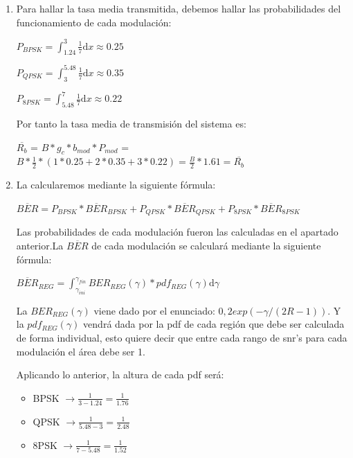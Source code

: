 \documentclass[fleqn,14pt]{article}
\begin{document}
\begin{enumerate}[1.]
    \item Para hallar la tasa media transmitida, debemos hallar las probabilidades del funcionamiento de cada modulación:

    \begin{center}
      $P_{BPSK} = \int_{1.24}^{3}\frac{1}{7} \mathrm{d}x \approx 0.25$

      $P_{QPSK} = \int_{3}^{5.48}\frac{1}{7} \mathrm{d}x \approx 0.35$

      $P_{8PSK} = \int_{5.48}^{7}\frac{1}{7} \mathrm{d}x \approx 0.22$
    \end{center}

    Por tanto la tasa media de transmisión del sistema es:
    \begin{center}
      $\overline{R_b}$ = $B * g_c * b_{mod} * P_{mod}$ = $B*\frac{1}{2}*(1*0.25+2*0.35+3*0.22) = \boxed{\frac{B}{2}*1.61 = \overline{R_b}}$\
    \end{center}

    \item La calcularemos mediante la siguiente fórmula:

    \centering
    $\overline{BER} = P_{BPSK} * \overline{BER}_{BPSK} + P_{QPSK} * \overline{BER}_{QPSK} + P_{8PSK} * \overline{BER}_{8PSK}$

    \raggedright
    Las probabilidades de cada modulación fueron las calculadas en el apartado anterior.La $\overline{BER}$ de cada modulación se calculará mediante la siguiente fórmula:

    \centering
    $\overline{BER}_{REG} = \int_{\gamma_{ini}}^{\gamma_{fin}}BER_{REG}(\gamma)*pdf_{REG}(\gamma) \mathrm{d}\gamma$

    \raggedright
    La $BER_{REG}(\gamma)$ viene dado por el enunciado:   $0,2exp(-\gamma/(2R - 1))$. Y la $pdf_{REG}(\gamma)$ vendrá dada por la pdf de cada región que debe ser calculada de forma individual, esto quiere decir que entre cada rango de snr's para cada modulación el área debe ser 1.



    Aplicando lo anterior, la altura de cada pdf será:
    \begin{itemize}
    \item BPSK $\rightarrow \frac{1}{3-1.24} = \frac{1}{1.76}$
    \item QPSK $\rightarrow \frac{1}{5.48-3} = \frac{1}{2.48}$
    \item 8PSK $\rightarrow \frac{1}{7-5.48} = \frac{1}{1.52}$
    \end{itemize}


\end{enumerate}
\end{document}
